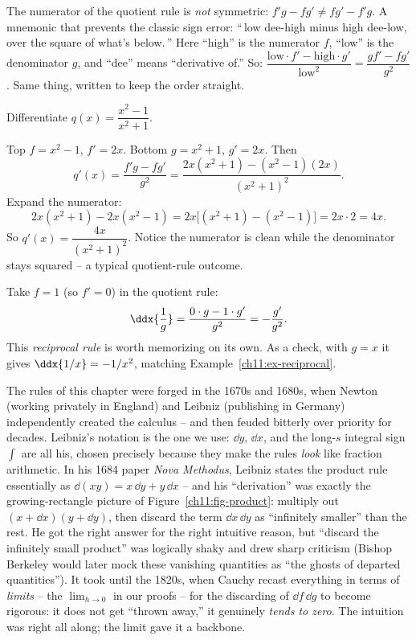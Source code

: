 \begin{trapbox}
The numerator of the quotient rule is \emph{not} symmetric: $f'g - fg' \ne fg' - f'g$. A
mnemonic that prevents the classic sign error: ``\,low dee-high minus high dee-low, over
the square of what's below.\,'' Here ``high'' is the numerator $f$, ``low'' is the
denominator $g$, and ``dee'' means ``derivative of.'' So:
$\dfrac{\text{low}\cdot f' - \text{high}\cdot g'}{\text{low}^2}
= \dfrac{g f' - f g'}{g^2}$. Same thing, written to keep the order straight.
\end{trapbox}

\begin{example}\label{ch11:ex-quot1}
Differentiate $q(x) = \dfrac{x^2 - 1}{x^2 + 1}$.

Top $f = x^2-1$, $f' = 2x$. Bottom $g = x^2+1$, $g' = 2x$. Then
\[
  q'(x) = \frac{f'g - fg'}{g^2}
        = \frac{2x(x^2+1) - (x^2-1)(2x)}{(x^2+1)^2}.
\]
Expand the numerator:
\[
  2x(x^2+1) - 2x(x^2-1) = 2x\big[(x^2+1)-(x^2-1)\big] = 2x\cdot 2 = 4x.
\]
So $q'(x) = \dfrac{4x}{(x^2+1)^2}$. Notice the numerator is clean while the denominator
stays squared -- a typical quotient-rule outcome.
\end{example}

\begin{example}\label{ch11:ex-quot2}
Take $f = 1$ (so $f' = 0$) in the quotient rule:
\[
  \ddx{\frac{1}{g}} = \frac{0\cdot g - 1\cdot g'}{g^2} = -\frac{g'}{g^2}.
\]
This \emph{reciprocal rule} is worth memorizing on its own. As a check, with $g=x$ it
gives $\ddx{1/x} = -1/x^2$, matching Example~\ref{ch11:ex-reciprocal}.
\end{example}

\begin{historybox}
The rules of this chapter were forged in the 1670s and 1680s, when Newton (working
privately in England) and Leibniz (publishing in Germany) independently created the
calculus -- and then feuded bitterly over priority for decades. Leibniz's notation is the
one we use: $\dd y$, $\dd x$, and the long-$s$ integral sign $\int$ are all his, chosen
precisely because they make the rules \emph{look} like fraction arithmetic. In his 1684
paper \emph{Nova Methodus}, Leibniz states the product rule essentially as
$\dd(xy) = x\,\dd y + y\,\dd x$ -- and his ``derivation'' was exactly the growing-rectangle
picture of Figure~\ref{ch11:fig-product}: multiply out $(x+\dd x)(y+\dd y)$, then discard
the term $\dd x\,\dd y$ as ``infinitely smaller'' than the rest. He got the right answer
for the right intuitive reason, but ``discard the infinitely small product'' was logically
shaky and drew sharp criticism (Bishop Berkeley would later mock these vanishing
quantities as ``the ghosts of departed quantities''). It took until the 1820s, when Cauchy
recast everything in terms of \emph{limits} -- the $\lim_{h\to 0}$ in our proofs -- for the
discarding of $\dd f\,\dd g$ to become rigorous: it does not get ``thrown away,'' it
genuinely \emph{tends to zero}. The intuition was right all along; the limit gave it a
backbone.
\end{historybox}

